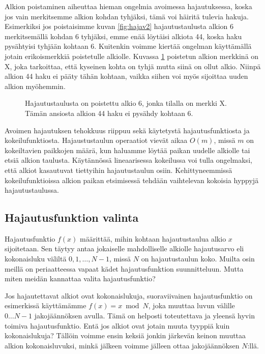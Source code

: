 Alkion poistaminen aiheuttaa hieman ongelmia avoimessa hajautuksessa,
koska jos vain merkitsemme alkion kohdan tyhjäksi, tämä voi häiritä tulevia hakuja.
Esimerkiksi jos poistaisimme kuvan \ref{fig:hajav2} hajautustaulusta alkion 6
merkitsemällä kohdan 6 tyhjäksi, emme enää löytäisi alkiota 44,
koska haku pysähtyisi tyhjään kohtaan 6.
Kuitenkin voimme kiertää ongelman käyttämällä jotain erikoismerkkiä
poistetulle alkiolle. Kuvassa \ref{fig:hajav3} poistetun alkion merkkinä on X,
joka tarkoittaa, että kyseinen kohta on tyhjä mutta siinä on ollut alkio.
Niinpä alkion 44 haku ei pääty tähän kohtaan,
vaikka siihen voi myös sijoittaa uuden alkion myöhemmin.

\begin{figure}
\center
{}
\caption{Hajautustaulusta on poistettu alkio 6, jonka tilalla on merkki X.
Tämän ansiosta alkion 44 haku ei pysähdy kohtaan 6.}
\label{fig:hajav3}
\end{figure}

Avoimen hajautuksen tehokkuus riippuu sekä käytetystä hajautusfunktiosta
ja kokeilufunktiosta.
Hajaustustaulun operaatiot vievät aikaa $O(m)$,
missä $m$ on kokeiltavien paikkojen määrä,
kun haluamme löytää paikan uudelle alkiolle
tai etsiä alkion taulusta.
Käytännössä lineaarisessa kokeilussa voi tulla ongelmaksi,
että alkiot kasautuvat tiettyihin hajautustaulun osiin.
Kehittyneemmissä kokeilufunktioissa alkion paikan etsimisessä
tehdään vaihtelevan kokoisia hyppyjä hajautustaulussa.

\subsection{Hajautusfunktion valinta}

Hajautusfunktio $f(x)$ määrittää, mihin kohtaan hajautustaulua
alkio $x$ sijoitetaan.
Sen täytyy antaa jokaiselle mahdolliselle alkiolle
hajautusarvo eli kokonaisluku väliltä $0,1,\dots,N-1$,
missä $N$ on hajautustaulun koko.
Muilta osin meillä on periaatteessa vapaat kädet
hajautusfunktion suunnitteluun.
Mutta miten meidän kannattaa valita hajautusfunktio?

Jos hajautettavat alkiot ovat kokonaislukuja,
suoraviivainen hajautusfunktio on esimerkissä käyttämämme $f(x)=x \bmod N$,
joka muuttaa luvun välille $0 \dots N-1$ jakojäännöksen avulla.
Tämä on helposti toteutettava ja yleensä hyvin toimiva hajautusfunktio.
Entä jos alkiot ovat jotain muuta tyyppiä kuin kokonaislukuja?
Tällöin voimme ensin keksiä jonkin järkevän keinon
muuttaa alkion kokonaisluvuksi,
minkä jälkeen voimme jälleen ottaa jakojäännöksen $N$:llä.

